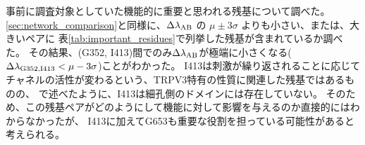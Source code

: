 事前に調査対象としていた機能的に重要と思われる残基について調べた。
\ref{sec:network_comparison}と同様に、$\Delta \lambda_{\rm{AB}}$ の $\mu \pm 3 \sigma$ よりも小さい、または、大きいペアに
表\ref{tab:important_residues}で列挙した残基が含まれているか調べた。
その結果、(G352, I413)間でのみ$\Delta \lambda_{\rm{AB}}$が極端に小さくなる($\Delta \lambda_{\rm{G352},\rm{I413}} < \mu - 3\sigma$)ことがわかった。
I413は刺激が繰り返されることに応じてチャネルの活性が変わるという、TRPV3特有の性質に関連した残基ではあるものの、
\label{sec:important_residues}で述べたように、I413は細孔側のドメインには存在していない。
そのため、この残基ペアがどのようにして機能に対して影響を与えるのか直接的にはわからなかったが、
I413に加えてG653も重要な役割を担っている可能性があると考えられる。
